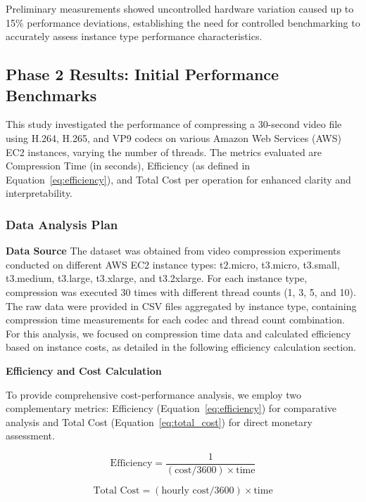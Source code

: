 \documentclass[conference]{IEEEtran}
\begin{document}
	Preliminary measurements showed uncontrolled hardware variation caused up to 15\% performance deviations, establishing the need for controlled benchmarking to accurately assess instance type performance characteristics.
	
	\subsection{Phase 2 Results: Initial Performance Benchmarks}
	\label{results-phase2}
	
	This study investigated the performance of compressing a 30-second video file using H.264, H.265, and VP9 codecs on various Amazon Web Services (AWS) EC2 instances, varying the number of threads. The metrics evaluated are Compression Time (in seconds), Efficiency (as defined in Equation~\ref{eq:efficiency}), and Total Cost per operation for enhanced clarity and interpretability.
	
	\subsubsection{Data Analysis Plan}
	
	\textbf{Data Source}
	The dataset was obtained from video compression experiments conducted on different AWS EC2 instance types: t2.micro, t3.micro, t3.small, t3.medium, t3.large, t3.xlarge, and t3.2xlarge. For each instance type, compression was executed 30 times with different thread counts (1, 3, 5, and 10). The raw data were provided in CSV files aggregated by instance type, containing compression time measurements for each codec and thread count combination. For this analysis, we focused on compression time data and calculated efficiency based on instance costs, as detailed in the following efficiency calculation section.
	
	\textbf{Efficiency and Cost Calculation}
	\label{efficiency-calculation}
	
	To provide comprehensive cost-performance analysis, we employ two complementary metrics: Efficiency (Equation~\ref{eq:efficiency}) for comparative analysis and Total Cost (Equation~\ref{eq:total_cost}) for direct monetary assessment.
	
	\begin{equation}
		\text{Efficiency} = \frac{1}{(\text{cost}/3600) \times \text{time}}
		\label{eq:efficiency}
	\end{equation}
	
	\begin{equation}
		\text{Total Cost} = (\text{hourly cost}/3600) \times \text{time}
		\label{eq:total_cost}
	\end{equation}
	
\end{document}
